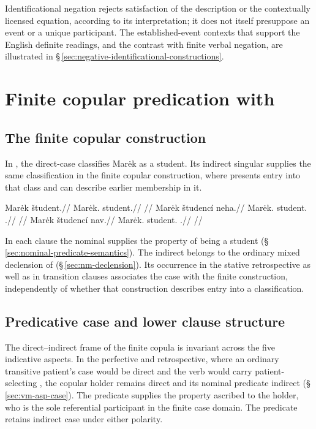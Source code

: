 Identificational negation rejects satisfaction of the description or the
contextually licensed equation, according to its interpretation; it does not
itself presuppose an event or a unique participant. The established-event
contexts that support the English definite readings, and the contrast with
finite verbal negation, are illustrated in
§\,\ref{sec:negative-identificational-constructions}.

\section{Finite copular predication with }\label{sec:neh}

\subsection{The finite copular construction}

In , the direct-case  classifies
Marėk as a student. Its indirect singular  supplies
the same classification in the finite copular construction, where
 presents entry into that class and  can describe
earlier membership in it.

\pex\label{ex:neh-construction-contrast}
\a
\begingl
\gla Marėk študent.//
\glb Marėk.\Dir{} student.\Dir{}//
\glft {}//
\endgl
\a
\begingl
\gla Marėk študencí neha.//
\glb Marėk.\Dir{} student.\Ind{} \Cop{}.\Cont{}//
\glft {}//
\endgl
\a
\begingl
\gla Marėk študencí nav.//
\glb Marėk.\Dir{} student.\Ind{} \Cop{}.\Ret{}//
\glft {}
//
\endgl
\xe

\noindent In each clause the nominal supplies the property of being a
student (§\,\ref{sec:nominal-predicate-semantics}).
The indirect  belongs to the ordinary mixed declension of
 (§\,\ref{sec:nm-declension}). Its occurrence in the
stative retrospective as well as in transition clauses associates the
case with the finite construction, independently of whether that
construction describes entry into a classification.

\subsection{Predicative case and lower clause structure}
\label{sec:neh-structure}

The direct--indirect frame of the finite copula is invariant across the
five indicative aspects. In the perfective and retrospective, where an
ordinary transitive patient's case would be direct and the verb would
carry patient-selecting , the copular holder remains direct
and its nominal predicate indirect (§\,\ref{sec:vm-asp-case}).
The predicate supplies the property ascribed to the holder, who is the
sole referential participant in the finite case domain. The predicate
retains indirect case under either polarity.


